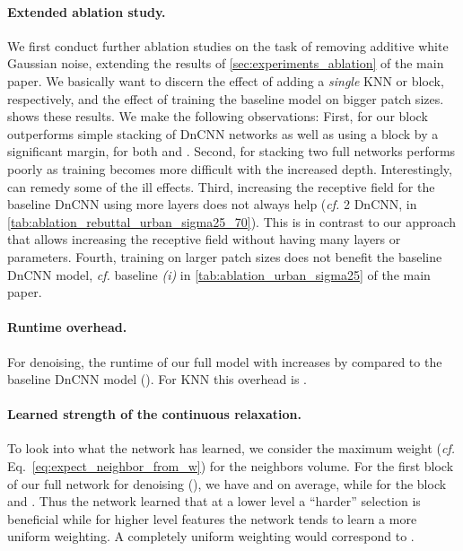 \documentclass{article}
\makeatletter
\newcommand{\cf}{\emph{cf.}\@\xspace}
\makeatother
\begin{document}
\paragraph{Extended ablation study.}
We first conduct further ablation studies on the task of removing additive white Gaussian noise, extending the results of \cref{sec:experiments_ablation} of the main paper. 
We basically want to discern the effect of adding a \emph{single} KNN or  block, respectively, and the effect of training the baseline model on bigger patch sizes. 
 shows these results.
We make the following observations:
First, for  our  block outperforms simple stacking of DnCNN networks as well as using a  block by a significant margin, for both  and .
Second, for  stacking two full networks performs poorly as training becomes more difficult with the increased depth.
Interestingly,  can remedy some of the ill effects.
Third, increasing the receptive field for the baseline DnCNN using more layers does not always help (\cf 2  DnCNN,  in \cref{tab:ablation_rebuttal_urban_sigma25_70}).
This is in contrast to our approach that allows increasing the receptive field without having many layers or parameters.
Fourth, training on larger patch sizes does not benefit the baseline DnCNN model, \cf baseline \emph{(i)} in \cref{tab:ablation_urban_sigma25} of the main paper.

\paragraph{Runtime overhead.}
For denoising, the runtime of our full model with  increases by  compared to the baseline DnCNN model ().
For KNN this overhead is .

\paragraph{Learned strength of the continuous relaxation.}
To look into what the network has learned, we consider the maximum weight  (\cf Eq.~\ref{eq:expect_neighbor_from_w}) for the  neighbors volume.
For the first  block of our full network for denoising (), we have  and  on average, while for the  block   and .
Thus the network learned that at a lower level a ``harder''  selection is beneficial while for higher level features the network tends to learn a more uniform weighting.
A completely uniform weighting would correspond to .
\end{document}
